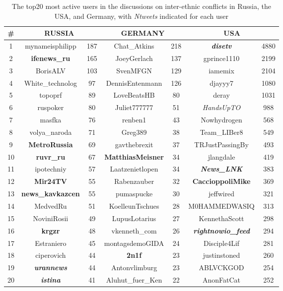 \begin{table}[ht]%
	\centering
	\caption{The top20 most active users in the discussions on inter-ethnic conflicts in Russia, the USA, and Germany, with \textit{Ntweets} indicated for each user}%
	\label{tab:top20InConflictDiscussions}%
	\begin{adjustbox}{width=1\textwidth}
		\small
		\begin{tabular}{ c  c  c  c  c  c  c }%
			\toprule
			\# & \multicolumn{2}{c}{RUSSIA} &  \multicolumn{2}{c}{GERMANY} & \multicolumn{2}{c}{USA}\\
			\hline
			1 & mynameisphilipp & 187 & Chat\_Atkins & 218 & \textit{\textbf{disetv}} & 4880 \\
			2 & \textbf{ifenews\_ru} & 165 & JoeyGerlach & 137 & gprince1110 & 2199 \\
			3 & BorisALV & 103 & SvenMFGN & 129 & iamemix & 2104 \\
			4 & White\_technolog & 97& DennisEntenmann & 126 & djayyy7 & 1080 \\
			5 & topoprf & 89 & LoveBeatsHB & 80 & deray & 1031\\
			6 & ruspoker & 80 & Juliet777777 & 51 & \textit{HandsUpTO} & 988\\
			7 & masfka & 76 & renben1 & 43 & Nowhydrogen & 568\\
			8 & volya\_naroda & 71 & Greg389 & 38 & Team\_LIBer8 & 549\\
			9 & \textbf{MetroRussia} & 69 & gavthebrexit & 37 & TRJustPassingBy & 493\\
			10 & \textbf{ruvr\_ru} & 67 & \textbf{MatthiasMeisner} & 34 & jlangdale & 419\\
			11 & ipotechniy & 57 & Laatzenietlopen & 34 & \textit{\textbf{News\_LNK}} & 383\\
			12 & \textbf{Mir24TV} & 55 & Rabenzauber & 32 & \textbf{CaccioppoliMike} & 369\\
			13 & \textbf{news\_kavkazcen} & 55 & pumaspucke & 30 & jeffwired & 321\\
			14 & MedvedRu & 51 & KoelleunTschues & 28 & M0HAMMEDWASIQ & 313\\
			15 & NoviniRosii & 49 & LupusLotarius & 27 & KennethaScott & 298\\
			16 & \textbf{krgzr} & 48 & vkenneth\_com & 26 & \textbf{\textit{rightnowio\_feed}} & 294\\
			17 & Estraniero & 45 & montagsdemoGIDA & 24 & Disciple4Lif & 281\\
			18 & ciperovich & 44 & \textbf{2n1f} & 23 & justinstoned & 260\\
			19 & \textbf{\textit{urannews}} & 44 & Antonvlimburg & 23 & ABLVCKGOD & 254\\
			20 & \textbf{\textit{istina}} & 41 & Aluhut\_fuer\_Ken & 22 & AnonFatCat & 252\\
			\bottomrule
		\end{tabular}%
	\end{adjustbox}
\end{table}

